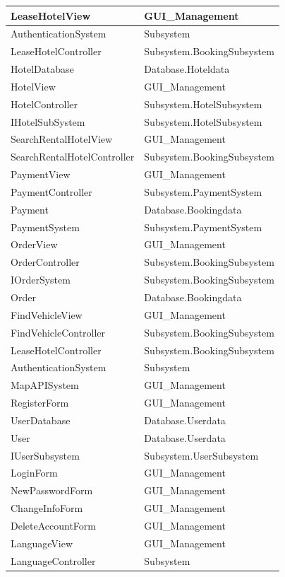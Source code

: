 \begin{longtable}{|p{6cm}|p{9cm}|}
\hline
LeaseHotelView & GUI\_Management \\
\hline
AuthenticationSystem & Subsystem \\
\hline
LeaseHotelController & Subsystem.BookingSubsystem \\
\hline
HotelDatabase & Database.Hoteldata \\
\hline
HotelView & GUI\_Management \\
\hline
HotelController & Subsystem.HotelSubsystem \\
\hline
IHotelSubSystem & Subsystem.HotelSubsystem \\
\hline
SearchRentalHotelView & GUI\_Management \\
\hline
SearchRentalHotelController & Subsystem.BookingSubsystem \\
\hline
PaymentView & GUI\_Management \\
\hline
PaymentController & Subsystem.PaymentSystem \\
\hline
Payment & Database.Bookingdata \\
\hline
PaymentSystem & Subsystem.PaymentSystem \\
\hline
OrderView & GUI\_Management \\
\hline
OrderController & Subsystem.BookingSubsystem \\
\hline
IOrderSystem & Subsystem.BookingSubsystem \\
\hline
Order & Database.Bookingdata \\
\hline
FindVehicleView & GUI\_Management \\
\hline
FindVehicleController & Subsystem.BookingSubsystem \\
\hline
LeaseHotelController & Subsystem.BookingSubsystem \\
\hline
AuthenticationSystem & Subsystem\\
\hline
MapAPISystem & GUI\_Management \\
\hline
RegisterForm & GUI\_Management \\
\hline
UserDatabase & Database.Userdata \\
\hline
User & Database.Userdata\\ 
\hline
IUserSubsystem & Subsystem.UserSubsystem \\
\hline
LoginForm & GUI\_Management \\
\hline
NewPasswordForm & GUI\_Management \\
\hline
ChangeInfoForm & GUI\_Management \\
\hline
DeleteAccountForm & GUI\_Management \\
\hline
LanguageView & GUI\_Management \\
\hline
LanguageController & Subsystem \\
\hline
\end{longtable}

